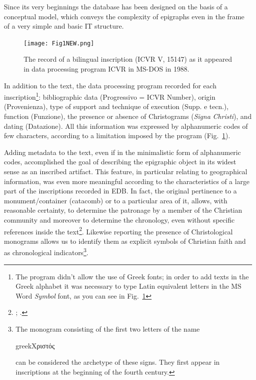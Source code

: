 \documentclass[amsthm,ebook]{saparticle}
\begin{document}
Since its very beginnings the database has been designed on the basis of a conceptual model, which conveys the
complexity of epigraphs even in the frame of a very simple and basic IT structure.



\begin{figure}[hbp]
\centering
 \texttt{[image: Fig1NEW.png]} 
\caption{The record of a bilingual inscription (ICVR V, 15147) as it appeared in data processing program ICVR in MS-DOS
in 1988.}
\label{fig:1}
\end{figure}




In addition to the text, the data processing program recorded for each inscription\footnote{ The program didn’t allow
the use of Greek fonts; in order to add texts in the Greek alphabet it was necessary to type Latin equivalent letters
in the MS Word \emph{Symbol} font, as you can see in Fig.~\ref{fig:1}}: bibliographic data (Progressivo = ICVR Number), origin
(Provenienza), type of support and technique of execution (Supp. e tecn.), function (Funzione), the presence or
absence of Christograms (\emph{Signa Christi}), and dating (Datazione). All this information was expressed by alphanumeric
codes of few characters, according to a limitation imposed by the program (Fig.~\ref{fig:1}).
%
%



Adding metadata to the text, even if in the minimalistic form of alphanumeric codes, accomplished the goal of describing
the epigraphic object in its widest sense as an inscribed artifact. This feature, in particular relating to
geographical information, was even more meaningful according to the characteristics of a large part of the inscriptions
recorded in EDB. In fact, the original pertinence to a monument/container (catacomb) or to a particular area of it,
allows, with reasonable certainty, to determine the patronage by a member of the Christian community and moreover to
determine the chronology, even without specific references inside the text\footnote{\citet{carletti_inscriptiones_1994}; \citet[viii-ix]{felle_introduzione_1997}.}. Likewise reporting the presence of Christological monograms allows us to identify them as explicit symbols
of Christian faith and as chronological indicators\footnote{ The monogram consisting of the first two letters of the
name \begin{otherlanguage*}{greek}Χριστός\end{otherlanguage*} can be considered the archetype of these signs. They first appear in inscriptions at the
beginning of the fourth century.}. 
\end{document}
